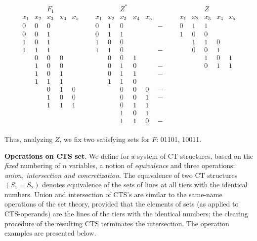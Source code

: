 \documentclass[12pt, a4paper]{article}
\begin{document}
$$
\begin{array}{ccccccccccccccccccccccc}
&& F_1 &&&&& && Z^* &&&&& &&& Z &&\\[3pt]
x_1&x_2&x_3&x_4&x_5&&&x_1&x_2&x_3&x_4&x_5&&&&x_1&x_2&x_3&x_4&x_5\\[3pt]
0&0&0&&&&& 0&1&0&&&-&&& 0&1&1&&\\
0&0&1&&&&& 0&1&1&&&&&& 1&0&0&&\\
1&0&1&&&&& 1&0&0&&&&&& &1&1&0&\\
1&1&1&&&&& 1&1&0&&&-&&& &0&0&1&\\
&0&0&0&&&& &0&0&1&&&&& &&1&0&1\\
&1&0&0&&&& &0&1&0&&-&&& &&0&1&1\\
&1&0&1&&&& &0&1&1&&-&&& &&&&\\
&1&1&1&&&& &1&1&0&&&&& &&&&\\
&&0&1&0&&& &&0&0&0&-&&& &&&&\\
&&1&0&0&&& &&0&0&1&-&&& &&&&\\
&&1&1&1&&& &&0&1&1&&&& &&&&\\
&&&&&&& &&1&0&1&&&& &&&&\\
&&&&&&& &&1&1&0&-&&& &&&&\\
\end{array}
$$

Thus, analyzing $Z$, we fix two satisfying sets for $F$: 01101, 10011.

\medskip
{\bf Operations on CTS set}. We define for a system of CT structures, based on the {\it fixed} numbering of $n$ variables, a notion of {\it equivalence} and three operations: {\it union, intersection {\rm and} concretization}. The equivalence of two CT structures $(S_1=S_2)$ denotes equivalence of the sets of lines at all tiers with the identical numbers. Union and intersection of CTS's are similar to the same-name operations of the set theory, provided that the elements of sets (as applied to CTS-operands) are the lines of the tiers with the identical numbers; the clearing procedure of the resulting CTS terminates the intersection. The operation examples are presented below.
\end{document}
